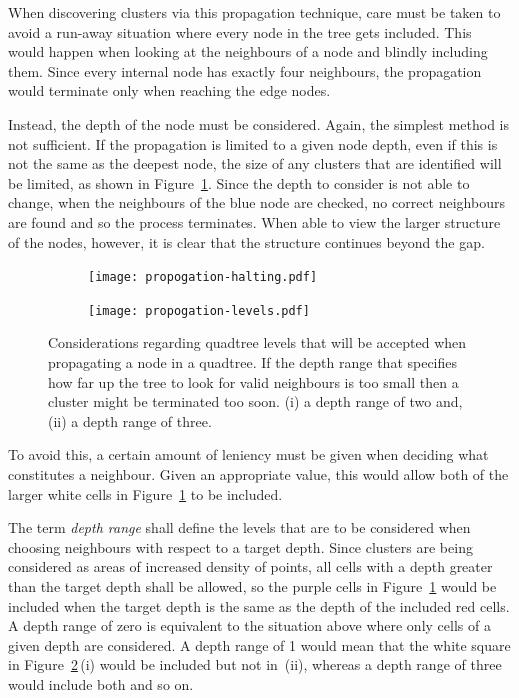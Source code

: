 When discovering clusters via this propagation technique, care must be taken to
avoid a run-away situation where every node in the tree gets included. This
would happen when looking at the neighbours of a node and blindly including
them. Since every internal node has exactly four neighbours, the propagation
would terminate only when reaching the edge nodes.

Instead, the depth of the node must be considered. Again, the simplest method
is not sufficient. If the propagation is limited to a given node depth, even if
this is not the same as the deepest node, the size of any clusters that are
identified will be limited, as shown in Figure~\ref{fig:propogation-halting}.
Since the depth to consider is not able to change, when the neighbours of the
blue node are checked, no correct neighbours are found and so the process
terminates. When able to view the larger structure of the nodes, however, it is
clear that the structure continues beyond the gap.

\begin{figure}[tbhp]
	\centering
	\begin{subfigure}[c]{5.2cm}
		\texttt{[image: propogation-halting.pdf]}
		\caption{} \label{fig:propogation-halting}
	\end{subfigure}%
	\quad
	\begin{subfigure}[c]{3.2cm}
		\texttt{[image: propogation-levels.pdf]}
		\caption{} \label{fig:propogation-levels}
	\end{subfigure}
	\caption{Considerations regarding quadtree levels that will be accepted
		when propagating a node in a quadtree. 
		If the depth range that specifies how far up the tree to look for valid
		neighbours is too small then a cluster might be terminated too soon.
		(i) a depth range of two and, (ii) a
		depth range of three.} \label{fig:prop-levels-halting}
\end{figure}

To avoid this, a certain amount of leniency must be given when deciding what
constitutes a neighbour. Given an appropriate value, this would allow both of
the larger white cells in Figure~\ref{fig:propogation-halting} to be included.

The term \emph{depth range} shall define the levels that are to be considered
when choosing neighbours with respect to a target depth. Since clusters are
being considered as areas of increased density of points, all cells with a
depth greater than the target depth shall be allowed, so the purple cells in
Figure~\ref{fig:propogation-halting} would be included when the target depth is
the same as the depth of the included red cells. A depth range of zero is
equivalent to the situation above where only cells of a given depth are
considered. A depth range of 1 would mean that the white square in
Figure~\ref{fig:propogation-levels}\,(i) would be included but not in~(ii),
whereas a depth range of three would include both and so on.

